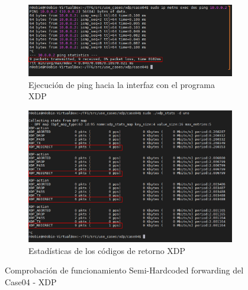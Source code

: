 \begin{figure}[h]
    \centering
    \begin{subfigure}[b]{\textwidth}
    	\centering
        \includegraphics[width=11cm]{archivos/img/dev/xdp/case04/demo_case04_semihard_2_edited.png}
        \caption{Ejecución de ping hacia la interfaz con el programa XDP}
        \label{fig:case04_xdp_ether_func2_ping}
    \end{subfigure}
    \par\bigskip
    \begin{subfigure}[b]{\textwidth}
    	\centering
        \includegraphics[width=14cm]{archivos/img/dev/xdp/case04/demo_case04_semihard_3_edited.png}
        \caption{Estadísticas de los códigos de retorno XDP}
        \label{fig:case04_xdp_ether_func2_stats}
    \end{subfigure}
    \caption{Comprobación de funcionamiento Semi-Hardcoded forwarding del Case04 - XDP}
    \label{fig:case04_xdp_ether_func2}
\end{figure}

    
